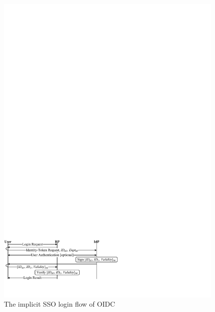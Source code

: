 \begin{figure}[b]
  \centering
  \includegraphics[width=1.0\linewidth]{fig/OIDC.pdf}
  \caption{The implicit SSO login flow of OIDC}
  \label{fig:OpenID}
\end{figure}

